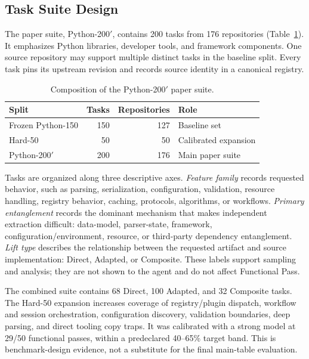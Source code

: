 \documentclass[acmsmall,anonymous,review,screen]{acmart}
\begin{document}
\subsection{Task Suite Design}

The paper suite, Python-200$'$, contains 200 tasks from 176 repositories
(Table~\ref{tab:suite}). It emphasizes Python libraries, developer tools, and
framework components. One source repository may support multiple distinct
tasks in the baseline split. Every task pins its upstream revision and records
source identity in a canonical registry.

\begin{table}[t]
  \caption{Composition of the Python-200$'$ paper suite.}
  \label{tab:suite}
  \centering
  \begin{tabular}{lrrl}
    \toprule
    \textbf{Split} & \textbf{Tasks} & \textbf{Repositories} & \textbf{Role} \\
    \midrule
    Frozen Python-150 & 150 & 127 & Baseline set \\
    Hard-50 & 50 & 50 & Calibrated expansion \\
    \midrule
    Python-200$'$ & 200 & 176 & Main paper suite \\
    \bottomrule
  \end{tabular}
\end{table}

Tasks are organized along three descriptive axes. \emph{Feature family}
records requested behavior, such as parsing, serialization, configuration,
validation, resource handling, registry behavior, caching, protocols,
algorithms, or workflows. \emph{Primary entanglement} records the dominant
mechanism that makes independent extraction difficult: data-model,
parser-state, framework, configuration/environment, resource, or third-party
dependency entanglement. \emph{Lift type} describes the relationship between
the requested artifact and source implementation: Direct, Adapted, or
Composite. These labels support sampling and analysis; they are not shown to
the agent and do not affect Functional Pass.

The combined suite contains 68 Direct, 100 Adapted, and 32 Composite tasks.
The Hard-50 expansion increases coverage of registry/plugin dispatch, workflow
and session orchestration, configuration discovery, validation boundaries,
deep parsing, and direct tooling copy traps. It was calibrated with a strong
model at 29/50 functional passes, within a predeclared 40--65\% target band.
This is benchmark-design evidence, not a substitute for the final main-table
evaluation.
\end{document}
